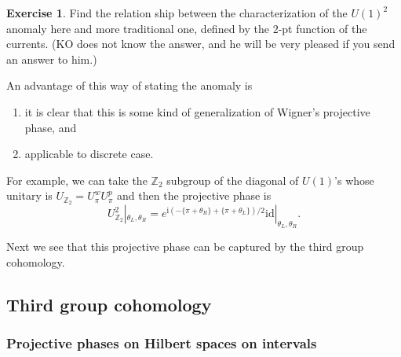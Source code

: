 \documentclass[
]{scrartcl}
\providecommand{\tightlist}{%
  \setlength{\itemsep}{0pt}\setlength{\parskip}{0pt}}
\numberwithin{equation}{section}
\theoremstyle{definition}
\theoremstyle{definition}
\theoremstyle{definition}
\newtheorem{exercise}{Exercise}[section]
\theoremstyle{definition}
\theoremstyle{remark}
\begin{document}
\begin{exercise}
Find the relation ship between the characterization of the \(U(1)^2\) anomaly here and more traditional one, defined by the 2-pt function of the currents. (KO does not know the answer, and he will be very pleased if you send an answer to him.)
\end{exercise}

An advantage of this way of stating the anomaly is

\begin{enumerate}
\def\labelenumi{\arabic{enumi}.}
\tightlist
\item
  it is clear that this is some kind of generalization of Wigner's projective phase, and
\item
  applicable to discrete case.
\end{enumerate}

For example, we can take the \(\mathbb{Z}_2\) subgroup of the diagonal of \(U(1)\)'s whose unitary is \(U_{\mathbb{Z}_2}=U^w_\pi U^p_\pi\) and then the projective phase is
\begin{equation}
    \label{eq:2dUZ2}
    U_{\mathbb{Z}_2}^2|_{\theta_L,\theta_R} = e^{\mathrm{i}(-\{\pi+\theta_R\}+\{\pi+\theta_L\})/2} \mathrm{id}|_{\theta_L,\theta_R}.
\end{equation}

Next we see that this projective phase can be captured by the third group cohomology.

\hypertarget{third-group-cohomology}{%
\subsection{Third group cohomology}\label{third-group-cohomology}}

\hypertarget{projective-phases-on-hilbert-spaces-on-intervals}{%
\subsubsection{Projective phases on Hilbert spaces on intervals}\label{projective-phases-on-hilbert-spaces-on-intervals}}
\end{document}
